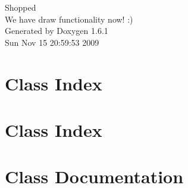 \documentclass[a4paper]{book}
\begin{document}
\hypersetup{pageanchor=false}
\begin{titlepage}
\vspace*{7cm}
\begin{center}
{\Large Shopped \\[1ex]\large We have draw functionality now! :) }\\
\vspace*{1cm}
{\large Generated by Doxygen 1.6.1}\\
\vspace*{0.5cm}
{\small Sun Nov 15 20:59:53 2009}\\
\end{center}
\end{titlepage}
\clearemptydoublepage
{}
\tableofcontents
\clearemptydoublepage
{}
\hypersetup{pageanchor=true}
\chapter{Class Index}

\chapter{Class Index}

\chapter{Class Documentation}





























\printindex
\end{document}
